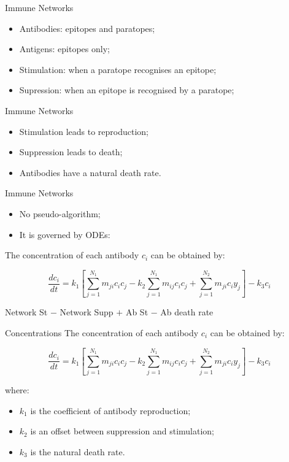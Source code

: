 \documentclass[xcolor=svgnames]{beamer}
\begin{document}
    \begin{frame}{Immune Networks}
        \begin{itemize}
            \item Antibodies: epitopes and paratopes;
            \item Antigens: epitopes only;
            \item Stimulation: when a paratope recognises an epitope;
            \item Supression: when an epitope is recognised by a paratope;
        \end{itemize}
    \end{frame}
    
    \begin{frame}{Immune Networks}
        \begin{itemize}
            \item Stimulation leads to reproduction;
            \item Suppression leads to death;
            \item Antibodies have a natural death rate.
        \end{itemize}
    \end{frame}    
    
    \begin{frame}{Immune Networks}
        \begin{itemize}
            \item No pseudo-algorithm;
            \item It is governed by ODEs:
        \end{itemize}
        
        The concentration of each antibody $c_{i}$ can be obtained by:
        
        $$ \frac{dc_{i}}{dt} = k_{1} \left[ \sum^{N_{1}}_{j=1}{m_{ji}c_{i}c_{j}} - k_{2} \sum^{N_{1}}_{j=1}{m_{ij}c_{i}c_{j}} + \sum^{N_{2}}_{j=1}{m_{ji}c_{i}y_{j}} \right] - k_{3}c_{i} $$
        
        \center Network St $-$ Network Supp $+$ Ab St $-$ Ab death rate
        
    \end{frame}
    
    \begin{frame}{Concentrations}
        The concentration of each antibody $c_{i}$ can be obtained by:
        
        $$ \frac{dc_{i}}{dt} = k_{1} \left[ \sum^{N_{1}}_{j=1}{m_{ji}c_{i}c_{j}} - k_{2} \sum^{N_{1}}_{j=1}{m_{ij}c_{i}c_{j}} + \sum^{N_{2}}_{j=1}{m_{ji}c_{i}y_{j}} \right] - k_{3}c_{i} $$
        
        where:
        
        \begin{itemize}
            \item $k_{1}$ is the coefficient of antibody reproduction;
            \item $k_{2}$ is an offset between suppression and stimulation;
            \item $k_{3}$ is the natural death rate.
        \end{itemize}
    \end{frame}
    
\end{document}
